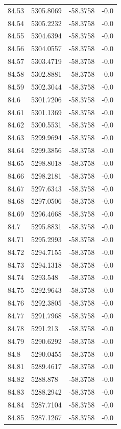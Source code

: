 \begin{table}[H]
\begin{tabular}{llll}
84.53 & 5305.8069 & -58.3758 & -0.0 \\
84.54 & 5305.2232 & -58.3758 & -0.0 \\
84.55 & 5304.6394 & -58.3758 & -0.0 \\
84.56 & 5304.0557 & -58.3758 & -0.0 \\
84.57 & 5303.4719 & -58.3758 & -0.0 \\
84.58 & 5302.8881 & -58.3758 & -0.0 \\
84.59 & 5302.3044 & -58.3758 & -0.0 \\
84.6 & 5301.7206 & -58.3758 & -0.0 \\
84.61 & 5301.1369 & -58.3758 & -0.0 \\
84.62 & 5300.5531 & -58.3758 & -0.0 \\
84.63 & 5299.9694 & -58.3758 & -0.0 \\
84.64 & 5299.3856 & -58.3758 & -0.0 \\
84.65 & 5298.8018 & -58.3758 & -0.0 \\
84.66 & 5298.2181 & -58.3758 & -0.0 \\
84.67 & 5297.6343 & -58.3758 & -0.0 \\
84.68 & 5297.0506 & -58.3758 & -0.0 \\
84.69 & 5296.4668 & -58.3758 & -0.0 \\
84.7 & 5295.8831 & -58.3758 & -0.0 \\
84.71 & 5295.2993 & -58.3758 & -0.0 \\
84.72 & 5294.7155 & -58.3758 & -0.0 \\
84.73 & 5294.1318 & -58.3758 & -0.0 \\
84.74 & 5293.548 & -58.3758 & -0.0 \\
84.75 & 5292.9643 & -58.3758 & -0.0 \\
84.76 & 5292.3805 & -58.3758 & -0.0 \\
84.77 & 5291.7968 & -58.3758 & -0.0 \\
84.78 & 5291.213 & -58.3758 & -0.0 \\
84.79 & 5290.6292 & -58.3758 & -0.0 \\
84.8 & 5290.0455 & -58.3758 & -0.0 \\
84.81 & 5289.4617 & -58.3758 & -0.0 \\
84.82 & 5288.878 & -58.3758 & -0.0 \\
84.83 & 5288.2942 & -58.3758 & -0.0 \\
84.84 & 5287.7104 & -58.3758 & -0.0 \\
84.85 & 5287.1267 & -58.3758 & -0.0 \\

\end{tabular}
\end{table}
